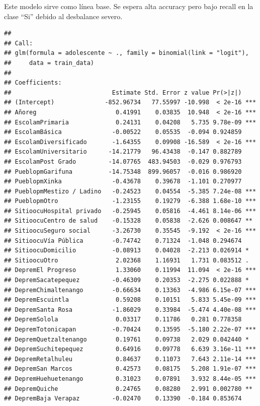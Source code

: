 \documentclass[
]{article}
\begin{document}
Este modelo sirve como línea base. Se espera alta accuracy pero bajo
recall en la clase ``Si'' debido al desbalance severo.

\begin{verbatim}
## 
## Call:
## glm(formula = adolescente ~ ., family = binomial(link = "logit"), 
##     data = train_data)
## 
## Coefficients:
##                            Estimate Std. Error z value Pr(>|z|)    
## (Intercept)              -852.96734   77.55997 -10.998  < 2e-16 ***
## Añoreg                      0.41991    0.03835  10.948  < 2e-16 ***
## EscolamPrimaria             0.24131    0.04208   5.735 9.78e-09 ***
## EscolamBásica              -0.00522    0.05535  -0.094 0.924859    
## EscolamDiversificado       -1.64355    0.09908 -16.589  < 2e-16 ***
## EscolamUniversitario      -14.21779   96.43438  -0.147 0.882789    
## EscolamPost Grado         -14.07765  483.94503  -0.029 0.976793    
## PueblopmGarifuna          -14.75348  899.96057  -0.016 0.986920    
## PueblopmXinka              -0.43678    0.39678  -1.101 0.270977    
## PueblopmMestizo / Ladino   -0.24523    0.04554  -5.385 7.24e-08 ***
## PueblopmOtro               -1.23155    0.19279  -6.388 1.68e-10 ***
## SitioocuHospital privado   -0.25945    0.05816  -4.461 8.14e-06 ***
## SitioocuCentro de salud    -0.15328    0.05838  -2.626 0.008647 ** 
## SitioocuSeguro social      -3.26730    0.35545  -9.192  < 2e-16 ***
## SitioocuVía Pública        -0.74742    0.71324  -1.048 0.294674    
## SitioocuDomicilio          -0.08913    0.04028  -2.213 0.026914 *  
## SitioocuOtro                2.02368    1.16931   1.731 0.083512 .  
## DepremEl Progreso           1.33060    0.11994  11.094  < 2e-16 ***
## DepremSacatepequez         -0.46309    0.20353  -2.275 0.022888 *  
## DepremChimaltenango        -0.66634    0.13363  -4.986 6.15e-07 ***
## DepremEscuintla             0.59208    0.10151   5.833 5.45e-09 ***
## DepremSanta Rosa           -1.86029    0.33984  -5.474 4.40e-08 ***
## DepremSolola                0.03317    0.11786   0.281 0.778358    
## DepremTotonicapan          -0.70424    0.13595  -5.180 2.22e-07 ***
## DepremQuetzaltenango        0.19761    0.09738   2.029 0.042440 *  
## DepremSuchitepequez         0.64916    0.09778   6.639 3.16e-11 ***
## DepremRetalhuleu            0.84637    0.11073   7.643 2.11e-14 ***
## DepremSan Marcos            0.42573    0.08175   5.208 1.91e-07 ***
## DepremHuehuetenango         0.31023    0.07891   3.932 8.44e-05 ***
## DepremQuiche                0.24765    0.08280   2.991 0.002780 ** 
## DepremBaja Verapaz         -0.02470    0.13390  -0.184 0.853674    

\end{verbatim}
\end{document}
